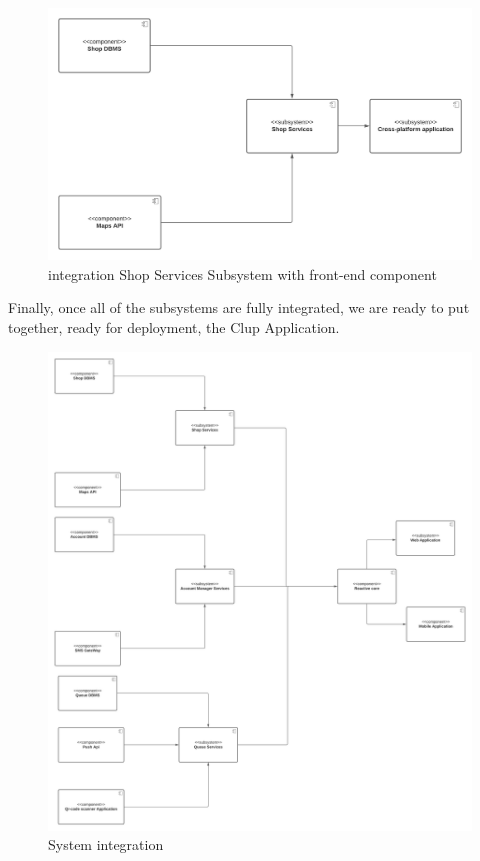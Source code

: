 \begin{figure}[h!]
    \centering
    \includegraphics[width=1\textwidth]{Images/Test Diagram/viewShop.png}
    \caption{\label{fig:viewAccount}{integration Shop Services Subsystem with front-end component}}
\end{figure} 


Finally, once all of the subsystems are fully integrated, we are ready to put together, ready for deployment, the Clup Application.

\begin{figure}[h!]
    \centering
    \includegraphics[width=1\textwidth]{Images/Test Diagram/whole application.png}
    \caption{\label{fig:wholeapp}{System integration}}
\end{figure} 






